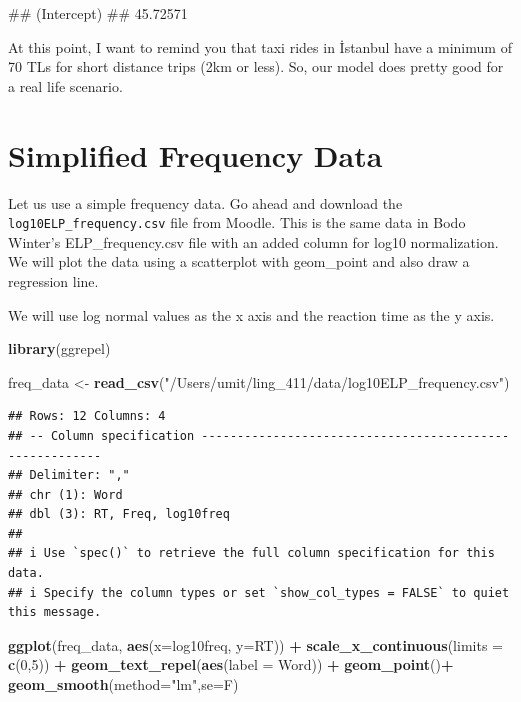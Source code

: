 \documentclass[
]{book}
\newenvironment{Shaded}{\begin{snugshade}}{\end{snugshade}}
\newcommand{\AttributeTok}[1]{\textcolor[rgb]{0.13,0.29,0.53}{#1}}
\newcommand{\DecValTok}[1]{\textcolor[rgb]{0.00,0.00,0.81}{#1}}
\newcommand{\FunctionTok}[1]{\textcolor[rgb]{0.13,0.29,0.53}{\textbf{#1}}}
\newcommand{\NormalTok}[1]{#1}
\newcommand{\OtherTok}[1]{\textcolor[rgb]{0.56,0.35,0.01}{#1}}
\newcommand{\SpecialCharTok}[1]{\textcolor[rgb]{0.81,0.36,0.00}{\textbf{#1}}}
\newcommand{\StringTok}[1]{\textcolor[rgb]{0.31,0.60,0.02}{#1}}
\begin{document}
\begin{Shaded}
\begin{Highlighting}[]
\NormalTok{\#\# (Intercept) }
\NormalTok{\#\#    45.72571}
\end{Highlighting}
\end{Shaded}

At this point, I want to remind you that taxi rides in İstanbul have a minimum of 70 TLs for short distance trips (2km or less). So, our model does pretty good for a real life scenario.

\hypertarget{simplified-frequency-data}{%
\section{Simplified Frequency Data}\label{simplified-frequency-data}}

Let us use a simple frequency data. Go ahead and download the \texttt{log10ELP\_frequency.csv} file from Moodle. This is the same data in Bodo Winter's ELP\_frequency.csv file with an added column for log10 normalization. We will plot the data using a scatterplot with geom\_point and also draw a regression line.

We will use log normal values as the x axis and the reaction time as the y axis.

\begin{Shaded}
\begin{Highlighting}[]
\FunctionTok{library}\NormalTok{(ggrepel)}


\NormalTok{freq\_data }\OtherTok{\textless{}{-}} \FunctionTok{read\_csv}\NormalTok{(}\StringTok{"/Users/umit/ling\_411/data/log10ELP\_frequency.csv"}\NormalTok{)}
\end{Highlighting}
\end{Shaded}

\begin{verbatim}
## Rows: 12 Columns: 4
## -- Column specification --------------------------------------------------------
## Delimiter: ","
## chr (1): Word
## dbl (3): RT, Freq, log10freq
## 
## i Use `spec()` to retrieve the full column specification for this data.
## i Specify the column types or set `show_col_types = FALSE` to quiet this message.
\end{verbatim}

\begin{Shaded}
\begin{Highlighting}[]
\FunctionTok{ggplot}\NormalTok{(freq\_data, }\FunctionTok{aes}\NormalTok{(}\AttributeTok{x=}\NormalTok{log10freq, }\AttributeTok{y=}\NormalTok{RT)) }\SpecialCharTok{+}
  \FunctionTok{scale\_x\_continuous}\NormalTok{(}\AttributeTok{limits =} \FunctionTok{c}\NormalTok{(}\DecValTok{0}\NormalTok{,}\DecValTok{5}\NormalTok{)) }\SpecialCharTok{+}
  \FunctionTok{geom\_text\_repel}\NormalTok{(}\FunctionTok{aes}\NormalTok{(}\AttributeTok{label =}\NormalTok{ Word)) }\SpecialCharTok{+}
  \FunctionTok{geom\_point}\NormalTok{()}\SpecialCharTok{+}
  \FunctionTok{geom\_smooth}\NormalTok{(}\AttributeTok{method=}\StringTok{"lm"}\NormalTok{,}\AttributeTok{se=}\NormalTok{F)}
\end{Highlighting}
\end{Shaded}
\end{document}
